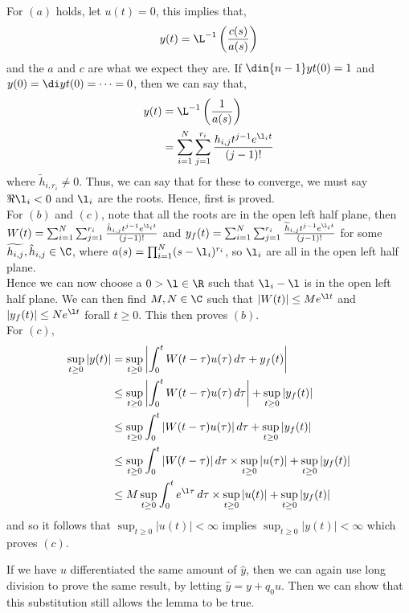 For $(a)$ holds, let $u(t) = 0$, this implies that,
$$ y(t) = \L^{-1}\left( \frac{c(s)}{a(s)}\right) $$
and the $a$ and $c$ are what we expect they are. If $\din {n-1} y t (0) = 1$ and $y(0) = \di y t (0) = \dots = 0$, then we can say that,
\begin{align*}
  y(t) &= \L^{-1}\left(\frac{1}{a(s)}\right)\\
  &= \sum_{i=1}^N \sum_{j = 1}^{r_i} \frac{h_{i,j}t^{j-1}e^{\l_i t}}{(j - 1)!}
\end{align*}
where $\widetilde{h}_{i, r_i} \ne 0$. Thus, we can say that for these to converge, we must say $\Re \l_i < 0$ and $\l_i$ are the roots. Hence, first is proved.\\
For $(b)$ and $(c)$, note that all the roots are in the open left half plane, then $W(t) = \sum_{i=1}^N \sum_{j=1}^{r_i} \frac{\hat{h}_{i, j}t^{j-1}e^{\l_i t}}{(j - 1)!}$ and $y_f (t) = \sum_{i=1}^N \sum_{j=1}^{r_i} \frac{\widetilde{h}_{i, j}t^{j-1}e^{\l_i t}}{(j - 1)!}$ for some $\widetilde{h_{i, j}}, \hat{h}_{i, j} \in \C$, where $a(s) = \prod_{i=1}^N (s - \l_i)^{r_i}$, so $\l_i$ are all in the open left half plane. \\
Hence we can now choose a $0 > \l \in \R$ such that $\l_i - \l$ is in the open left half plane. We can then find $M, N  \in \C$ such that $|W(t)| \le Me^{\l t}$ and $|y_f (t)| \le Ne^{\l t}$ forall $t \ge 0$. This then proves $(b)$. \\

For $(c)$,
\begin{align*}
  \sup_{t \ge 0} |y(t)| &= \sup_{t \ge 0} \left| \int^t_0 W(t - \tau)u(\tau) \,d\tau + y_f(t) \right| \\
  &\le \sup_{t \ge 0} \left| \int^t_0 W(t - \tau)u(\tau) \,d\tau \right|  + \sup_{t \ge 0}| y_f(t) | \\
  &\le \sup_{t \ge 0} \int^t_0 |W(t - \tau)u(\tau)| \,d\tau  + \sup_{t \ge 0}| y_f(t) | \\
  &\le \sup_{t \ge 0} \int^t_0 |W(t - \tau)|\,d\tau \times \sup_{t\ge 0} |u(\tau)|  + \sup_{t \ge 0}| y_f(t) | \\
  &\le M\sup_{t \ge 0} \int_0^t e^{\l \tau}\,d\tau \times \sup_{t \ge 0} |u(t)| + \sup_{t \ge 0} |y_f (t)|
\end{align*}
and so it follows that $\sup_{t \ge 0} |u(t)| < \infty$ implies $\sup_{t \ge 0} |y(t)| < \infty$ which proves $(c)$.

If we have $u$ differentiated the same amount of $\hat{y}$, then we can again use long division to prove the same result, by letting $\hat y = y + q_0u$. Then we can show that this substitution still allows the lemma to be true.

